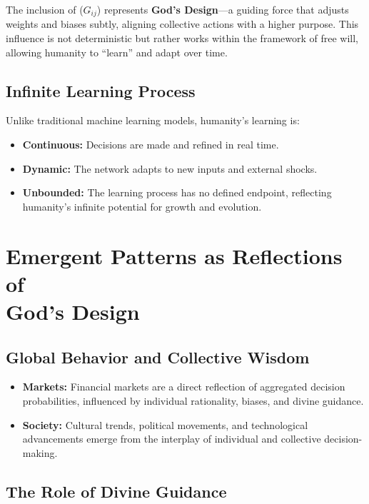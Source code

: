 \documentclass[a4]{article}
\begin{document}
The inclusion of ($G_{ij}$) represents {\bf God's Design}---a guiding force that adjusts weights and biases subtly, aligning collective actions with a higher purpose. This influence is not deterministic but rather works within the framework of free will, allowing humanity to ``learn'' and adapt over time.

\subsection{Infinite Learning Process}

Unlike traditional machine learning models, humanity's learning is:  

\begin{itemize}
\item  {\bf Continuous:} Decisions are made and refined in real time.  
\item {\bf Dynamic:} The network adapts to new inputs and external shocks.  
\item {\bf Unbounded:} The learning process has no defined endpoint, reflecting humanity's infinite potential for growth and evolution.  
\end{itemize}

\section{Emergent Patterns as Reflections of\\ God's Design}

\subsection{Global Behavior and Collective Wisdom}

\begin{itemize}
\item  {\bf Markets:} Financial markets are a direct reflection of aggregated decision probabilities, influenced by individual rationality, biases, and divine guidance.  
\item {\bf Society:} Cultural trends, political movements, and technological advancements emerge from the interplay of individual and collective decision-making.  
\end{itemize}

\subsection{The Role of Divine Guidance}
\end{document}
